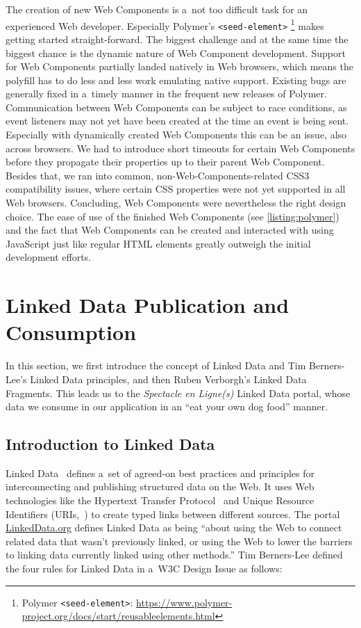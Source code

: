 \documentclass[runningheads,a4paper]{llncs}
\begin{document}
The creation of new Web Components is a~not too difficult task
for an experienced Web developer.
Especially Polymer's \texttt{<seed-element>}%
\footnote{Polymer \texttt{<seed-element>}:
\url{https://www.polymer-project.org/docs/start/reusableelements.html}}
makes getting started straight-forward.
The biggest challenge and at the same time the biggest chance
is the dynamic nature of Web Component development.
Support for Web Components partially landed natively in Web browsers,
which means the polyfill has to do less and less work emulating native support.
Existing bugs are generally fixed in a~timely manner in the frequent new releases of Polymer.
Communication between Web Components can be subject to race conditions,
as event listeners may not yet have been created at the time an event is being sent.
Especially with dynamically created Web Components this can be an issue,
also across browsers.
We had to introduce short timeouts for certain Web Components
before they propagate their properties up to their parent Web Component.
Besides that, we ran into common, non-Web-Components-related CSS3 compatibility issues,
where certain CSS properties were not yet supported in all Web browsers.
Concluding, Web Components were nevertheless the right design choice.
The ease of use of the finished Web Components (see \autoref{listing:polymer})
and the fact that Web Components can be created and interacted with using JavaScript
just like regular HTML elements greatly outweigh the initial development efforts.


\section{Linked Data Publication and Consumption}
\label{sec:linked-data-publication-and-consumption}

In this section, we first introduce the concept of Linked Data
and Tim Berners-Lee's Linked Data principles,
and then Ruben Verborgh's Linked Data Fragments.
This leads us to the \emph{Spectacle en Ligne(s)} Linked Data portal,
whose data we consume in our application in an ``eat your own dog food'' manner.

\subsection{Introduction to Linked Data}

Linked Data~\cite{bernerslee2006linkeddata} defines a~set of agreed-on
best practices and principles for interconnecting and publishing structured data on the Web.
It uses Web technologies like the Hypertext Transfer Protocol~\cite{fielding1999http}
and Unique Resource Identifiers (URIs,~\cite{bernerslee2005uri})
to create typed links between different sources.
The portal \url{LinkedData.org} defines Linked Data as being
``about using the Web to connect related data that wasn't previously linked,
or using the Web to lower the barriers to linking data currently linked using other methods.''
Tim Berners-Lee defined the four rules for Linked Data in a~W3C Design Issue as follows:
\end{document}
